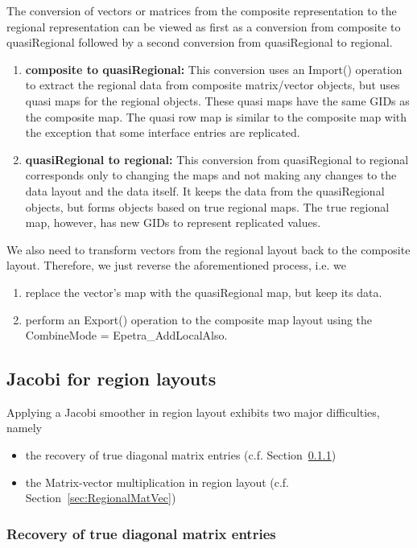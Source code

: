 \documentclass[11pt]{article}
\begin{document}
The conversion of vectors or matrices from the
composite representation to the regional representation can be viewed as
first as a conversion from composite to quasiRegional  followed by
a second conversion from quasiRegional to regional.
\begin{enumerate}
 \item {\bf composite to quasiRegional:} This conversion uses an {\sf Import()} operation
 to extract the regional data from composite matrix/vector objects, but uses quasi maps
 for the regional objects. These quasi maps have the same GIDs
 as the composite map. The quasi row map is similar to the composite
 map with the exception that some interface entries are replicated.
 \item {\bf quasiRegional to regional:} This conversion from quasiRegional to regional corresponds
 only to changing the maps and not making any changes to the data layout and the data itself.
 It keeps the data from the quasiRegional objects,
 but forms objects based on true regional maps.
 The true regional map, however, has new GIDs to represent replicated values.
\end{enumerate}
We also need to transform vectors from the regional layout back to the composite layout. Therefore, we just reverse the aforementioned process, i.e. we
\begin{enumerate}
 \item replace the vector's map with the quasiRegional map, but keep its data.
 \item perform an {\sf Export()} operation to the composite map layout using the {\sf CombineMode = Epetra\_AddLocalAlso}.
\end{enumerate}

\subsection{Jacobi for region layouts}
\label{sec:RegionJacobi}

Applying a Jacobi smoother in region layout exhibits two major difficulties, namely
\begin{itemize}
\item the recovery of true diagonal matrix entries (c.f. Section~\ref{sec:RecoveryTrueDiagonal})
\item the Matrix-vector multiplication in region layout (c.f. Section~\ref{sec:RegionalMatVec})
\end{itemize}

\subsubsection{Recovery of true diagonal matrix entries}
\label{sec:RecoveryTrueDiagonal}
\end{document}
